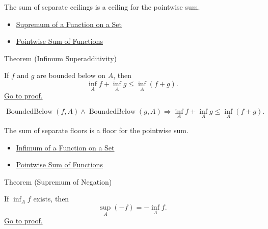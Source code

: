 \begin{remark*}[Interpretation]
The sum of separate ceilings is a ceiling for the pointwise sum.
\end{remark*}

\begin{dependencies}
\begin{itemize}
  \item \hyperref[def:function-supremum-on-set]{Supremum of a Function on a Set}
  \item \hyperref[def:pointwise-sum-of-functions]{Pointwise Sum of Functions}
\end{itemize}
\end{dependencies}

\begin{theorembox}{Theorem (Infimum Superadditivity)}
\begin{theorem}
\label{thm:infimum-superadditivity}
If \(f\) and \(g\) are bounded below on \(A\), then
\[
  \inf_A f+\inf_A g\leq \inf_A(f+g).
\]
\hyperref[prf:infimum-superadditivity]{Go to proof.}
\end{theorem}
\end{theorembox}

\begin{remark*}
\[
  \operatorname{BoundedBelow}(f,A)\wedge\operatorname{BoundedBelow}(g,A)
  \Rightarrow
  \inf_A f+\inf_A g\leq \inf_A(f+g).
\]
\end{remark*}

\begin{remark*}[Interpretation]
The sum of separate floors is a floor for the pointwise sum.
\end{remark*}

\begin{dependencies}
\begin{itemize}
  \item \hyperref[def:function-infimum-on-set]{Infimum of a Function on a Set}
  \item \hyperref[def:pointwise-sum-of-functions]{Pointwise Sum of Functions}
\end{itemize}
\end{dependencies}

\begin{theorembox}{Theorem (Supremum of Negation)}
\begin{theorem}
\label{thm:supremum-negation}
If \(\inf_A f\) exists, then
\[
  \sup_A(-f)=-\inf_A f.
\]
\hyperref[prf:supremum-negation]{Go to proof.}
\end{theorem}
\end{theorembox}

